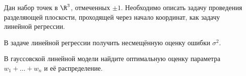 \begin{state}
    Дан набор точек в $\R^3$, отмеченных $\pm1$.
    Необходимо описать задачу проведения разделяющей плоскости, проходящей через начало координат, как задачу линейной регрессии.
\end{state}

\begin{state}
    В задаче линейной регрессии получить несмещённую оценку ошибки $\sigma^2$.
\end{state}

\begin{state}
    В гауссовской линейной модели найдите оптимальную оценку параметра $w_1 + \ldots +w_n$ и её распределение.
\end{state}
